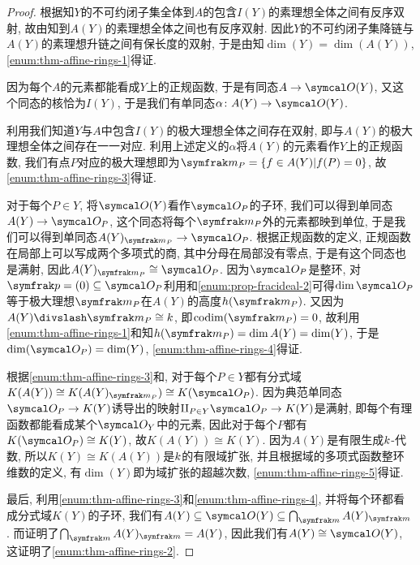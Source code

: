 \begin{proof}
  根据知$Y$的不可约闭子集全体到$A$的包含$I(Y)$的素理想全体之间有反序双射, 故由知到$A(Y)$的素理想全体之间也有反序双射. 因此$Y$的不可约闭子集降链与$A(Y)$的素理想升链之间有保长度的双射, 于是由知$\dim (Y)=\dim (A(Y))$, \ref{enum:thm-affine-rings-1}得证.

  因为每个$A$的元素都能看成$Y$上的正规函数, 于是有同态$A\to \OO (Y)$, 又这个同态的核恰为$I(Y)$, 于是我们有单同态$\alpha\colon A(Y)\to \OO (Y)$.

  利用我们知道$Y$与$A$中包含$I(Y)$的极大理想全体之间存在双射, 即与$A(Y)$的极大理想全体之间存在一一对应. 利用上述定义的$\alpha$将$A(Y)$的元素看作$Y$上的正规函数, 我们有点$P$对应的极大理想即为$\ideal{m}_{P}=\{f\in A(Y)\vert f(P)=0\}$, 故\ref{enum:thm-affine-rings-3}得证.

  对于每个$P\in Y$, 将$\OO (Y)$看作$\OO_P$的子环, 我们可以得到单同态$A(Y)\to \OO_P$, 这个同态将每个$\ideal{m}_P$外的元素都映到单位, 于是我们可以得到单同态$A(Y)_{\ideal{m}_{P}}\to \OO_P$. 根据正规函数的定义, 正规函数在局部上可以写成两个多项式的商, 其中分母在局部没有零点, 于是有这个同态也是满射, 因此$A(Y)_{\ideal{m}_P}\cong \OO_P$. 因为$\OO_P$是整环, 对$\ideal{p}=(0)\subseteq \OO_P$利用和\ref{enum:prop-fracideal-2}可得$\dim \OO_P$等于极大理想$\ideal{m}_P$在$A(Y)$的高度$h(\ideal{m}_P)$. 又因为$A(Y){\divslash}\ideal{m}_P\cong \kk$, 即$\codim (\ideal{m}_P)=0$, 故利用\ref{enum:thm-affine-rings-1}和知$h(\ideal{m}_P)=\dim A(Y)=\dim (Y)$, 于是$\dim (\OO_P)=\dim (Y)$, \ref{enum:thm-affine-rings-4}得证.

  根据\ref{enum:thm-affine-rings-3}和, 对于每个$P\in Y$都有分式域$K(A(Y))\cong K(A(Y)_{\ideal{m}_P})\cong K(\OO_P)$. 因为典范单同态$\OO_P\to K(Y)$诱导出的映射$\amalg_{P\in Y}\OO_P\to K(Y)$是满射, 即每个有理函数都能看成某个$\OO_Y$中的元素, 因此对于每个$P$都有$K(\OO_P)\cong K(Y)$, 故$K(A(Y))\cong K(Y)$. 因为$A(Y)$是有限生成$k$-代数, 所以$K(Y)\cong K(A(Y))$是$k$的有限域扩张, 并且根据域的多项式函数整环维数的定义, 有$\dim (Y)$即为域扩张的超越次数, \ref{enum:thm-affine-rings-5}得证.

  最后, 利用\ref{enum:thm-affine-rings-3}和\ref{enum:thm-affine-rings-4}, 并将每个环都看成分式域$K(Y)$的子环, 我们有$A(Y)\subseteq\OO (Y)\subseteq \bigcap_{\ideal{m}} A(Y)_{\ideal{m}}$. 而证明了$\bigcap_{\ideal{m}} A(Y)_{\ideal{m}}= A(Y)$, 因此我们有$A(Y)\cong \OO(Y)$, 这证明了\ref{enum:thm-affine-rings-2}.
\end{proof}

